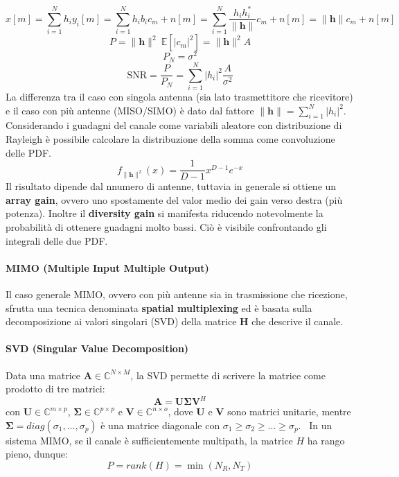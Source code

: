 \[
    x[m] = \sum_{i=1}^{N} h_i y_i[m]  = \sum_{i=1}^{N} h_i b_i c_m + n[m] = \sum_{i=1}^{N} \frac{h_i h_i^*}{\| \mathbf{h} \|} c_m + n[m] = \| \mathbf{h} \| c_m + n[m]
\]
\[
    P = \|\mathbf{h} \|^2 \ \mathbb{E} \left[\left| c_m \right|^2 \right] = \|\mathbf{h} \|^2  A
\]
\[
    P_N = \sigma^2  
\]
\[
    \text{SNR} = \frac{P}{P_N} = \sum_{i=1}^{N} |h_i|^2 \frac{A}{\sigma^2}    
\]
La differenza tra il caso con singola antenna (sia lato trasmettitore che ricevitore) e il caso con più antenne (MISO/SIMO) è dato dal fattore $\| \mathbf{h} \| = \sum_{i=1}^{N} |h_i|^2$.
Considerando i guadagni del canale come variabili aleatore con distribuzione di Rayleigh è possibile calcolare la distribuzione della somma come convoluzione delle PDF.
\[
    f_{\| \mathbf{h} \|^2} (x) = \frac{1}{D-1} x^{D-1} e^{-x}
\]
Il risultato dipende dal nnumero di antenne, tuttavia in generale si ottiene un \textbf{array gain}, ovvero uno spostamente del valor medio dei gain verso destra (più potenza).
Inoltre il \textbf{diversity gain} si manifesta riducendo notevolmente la probabilità di ottenere guadagni molto bassi.
Ciò è visibile confrontando gli integrali delle due PDF.

\paragraph*{MIMO (Multiple Input Multiple Output)}

Il caso generale MIMO, ovvero con più antenne sia in trasmissione che ricezione, sfrutta una tecnica denominata \textbf{spatial multiplexing} ed è basata sulla decomposizione ai valori singolari (SVD) della matrice $\mathbf{H}$ che descrive il canale.

\paragraph*{SVD (Singular Value Decomposition)}

Data una matrice $\mathbf{A} \in \mathbb{C}^{N \times M}$, la SVD permette di scrivere la matrice come prodotto di tre matrici:
\[
    \mathbf{A} = \mathbf{U} \mathbf{\Sigma} \mathbf{V}^H
\]
con $\mathbf{U} \in \mathbb{C}^{m \times p}$, $\mathbf{\Sigma} \in \mathbb{C}^{p \times p}$ e $\mathbf{V} \in \mathbb{C}^{n \times o}$,
dove $\mathbf{U}$ e $\mathbf{V}$ sono matrici unitarie, mentre $\mathbf{\Sigma} = diag(\sigma_1, \ldots, \sigma_p)$ è una matrice diagonale con $\sigma_1 \geq \sigma_2 \geq \ldots \geq \sigma_p$. 
\
In un sistema MIMO, se il canale è sufficientemente multipath, la matrice $H$ ha rango pieno, dunque:
\[
    P = rank(H) = \min(N_R, N_T)
\]

